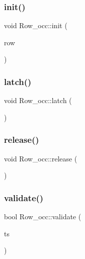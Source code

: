 \mbox{\label{classRow__occ_abf6ea6681c71eaea7300bc060466ad8e}} 
\subsubsection{\texorpdfstring{init()}{init()}}
{\footnotesize\ttfamily void Row\+\_\+occ\+::init (\begin{DoxyParamCaption}\item[{\hyperlink{classrow__t}{row\+\_\+t} $\ast$}]{row }\end{DoxyParamCaption})}

\mbox{\label{classRow__occ_a0a27281b67a7675a9cc6fd6cf291cdea}} 
\subsubsection{\texorpdfstring{latch()}{latch()}}
{\footnotesize\ttfamily void Row\+\_\+occ\+::latch (\begin{DoxyParamCaption}{ }\end{DoxyParamCaption})}

\mbox{\label{classRow__occ_aff7840808f4586862c3175439356ef4a}} 
\subsubsection{\texorpdfstring{release()}{release()}}
{\footnotesize\ttfamily void Row\+\_\+occ\+::release (\begin{DoxyParamCaption}{ }\end{DoxyParamCaption})}

\mbox{\label{classRow__occ_afee9bed0ed7de312a90eba7878355950}} 
\subsubsection{\texorpdfstring{validate()}{validate()}}
{\footnotesize\ttfamily bool Row\+\_\+occ\+::validate (\begin{DoxyParamCaption}\item[{uint64\+\_\+t}]{ts }\end{DoxyParamCaption})}

